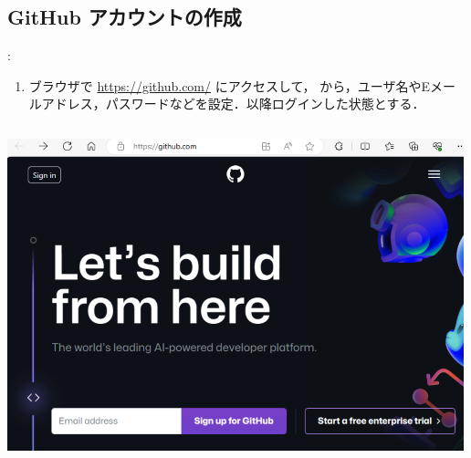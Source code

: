 \documentclass[aspectratio=169,dvipdfmx,cjk]{beamer}
\begin{document}
\subsection{GitHub アカウントの作成}
\begin{frame}{\insertsection \thesubsection: \insertsubsection}
  \begin{enumerate}
    \item ブラウザで \href{https://github.com/}{https://github.com/} にアクセスして， から，ユーザ名やEメールアドレス，パスワードなどを設定\cite{GitHubAccount}．以降ログインした状態とする．
  \end{enumerate}
  \begin{columns}
    \begin{column}{0.4\textwidth}
        \includegraphics[width=1.0\linewidth]{fig/github.png}
    \end{column}
  \end{columns}
\end{frame}
\end{document}
